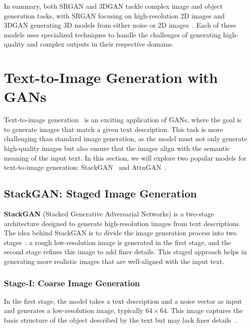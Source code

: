 In summary, both SRGAN and 3DGAN tackle complex image and object generation tasks, with SRGAN focusing on high-resolution 2D images and 3DGAN generating 3D models from either noise or 2D images~\cite{wu2016learning}. Each of these models uses specialized techniques to handle the challenges of generating high-quality and complex outputs in their respective domains.










\section{Text-to-Image Generation with GANs}
Text-to-image generation~\cite{reed2016generative} is an exciting application of GANs, where the goal is to generate images that match a given text description. This task is more challenging than standard image generation, as the model must not only generate high-quality images but also ensure that the images align with the semantic meaning of the input text. In this section, we will explore two popular models for text-to-image generation: StackGAN~\cite{zhang2017stackgan} and AttnGAN~\cite{xu2017attngan}.

\subsection{StackGAN: Staged Image Generation}

\textbf{StackGAN} (Stacked Generative Adversarial Networks) is a two-stage architecture designed to generate high-resolution images from text descriptions. The idea behind StackGAN is to divide the image generation process into two stages~\cite{zhang2017stackgan}: a rough low-resolution image is generated in the first stage, and the second stage refines this image to add finer details. This staged approach helps in generating more realistic images that are well-aligned with the input text.

\subsubsection{Stage-I: Coarse Image Generation}

In the first stage, the model takes a text description and a noise vector as input and generates a low-resolution image, typically \(64 \times 64\). This image captures the basic structure of the object described by the text but may lack finer details~\cite{lu2024coarse}.

